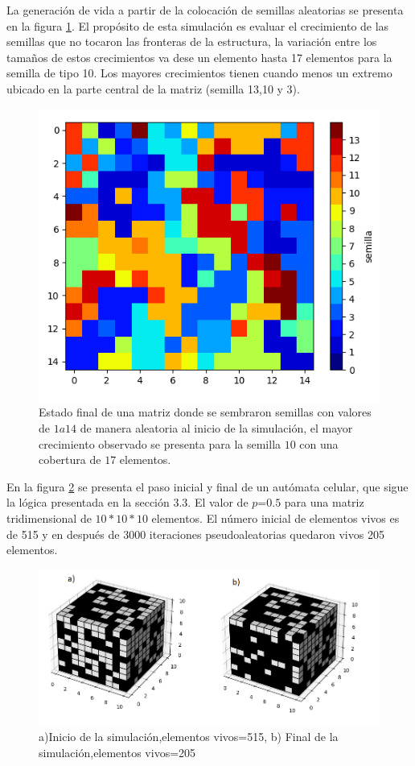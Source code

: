 \documentclass{article}
\begin{document}
La generación de vida a partir de la colocación de semillas aleatorias se presenta en la figura \ref{semillas}. El propósito de esta simulación es evaluar el crecimiento de las semillas que no tocaron las fronteras de la estructura, la variación entre los tamaños de estos crecimientos va dese un elemento hasta 17 elementos para la semilla de tipo 10. Los mayores crecimientos tienen cuando menos un extremo ubicado en la parte central de la matriz (semilla 13,10 y 3). 
\begin{figure} 
    \centering
    \includegraphics[width=140mm]{semillas.png} 
    \caption{Estado final de una matriz donde se sembraron semillas con valores de $1 a 14$ de manera aleatoria al inicio de la simulación, el mayor crecimiento observado se presenta para la semilla $10$ con una cobertura de $17$ elementos.}
    \label{semillas}
\end{figure}
En la figura \ref{3d} se presenta el paso inicial y final de un autómata celular, que sigue la lógica presentada en la sección 3.3. El valor de $p$=$0.5$ para una matriz tridimensional de $10*10*10$ elementos. El número inicial de elementos vivos es de 515 y en después de 3000 iteraciones pseudoaleatorias quedaron vivos 205 elementos. 
\begin{figure} 
    \centering
    \includegraphics[width=140mm]{3d.png} 
    \caption{a)Inicio de la simulación,elementos vivos=515, b) Final de la simulación,elementos vivos=205}
    \label{3d}
\end{figure}
\end{document}

